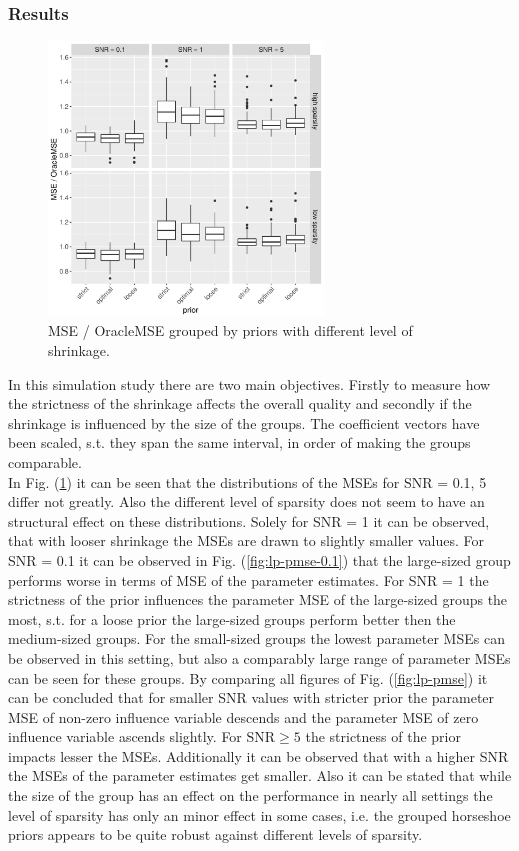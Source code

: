 \documentclass[12pt,letterpaper]{article}
\numberwithin{equation}{subsection}
\begin{document}
\subsubsection{Results}
\label{sec:lpres}
\begin{figure}[hbt!]
 \centering
 \includegraphics[width=0.65\textwidth]{../plots/lp-mse.pdf}
 \caption[MSE / OracleMSE (linear predictor scenario)]{MSE / OracleMSE grouped by priors with different level of shrinkage.}
 \label{fig:lp-mse}
\end{figure}
In this simulation study there are two main objectives. Firstly to measure how the strictness of the shrinkage affects the overall quality and secondly if the shrinkage is influenced by the size of the groups. The coefficient vectors have been scaled, s.t. they span the same interval, in order of making the groups comparable. \\
In Fig. (\ref{fig:lp-mse}) it can be seen that the distributions of the MSEs for SNR = 0.1, 5 differ not greatly. Also the different level of sparsity does not seem to have an structural effect on these distributions. Solely for SNR = 1 it can be observed, that with looser shrinkage the MSEs are drawn to slightly smaller values. For SNR = 0.1 it can be observed in Fig. (\ref{fig:lp-pmse-0.1}) that the large-sized group performs worse in terms of MSE of the parameter estimates. For SNR = 1 the strictness of the prior influences the parameter MSE of the large-sized groups the most, s.t. for a loose prior the large-sized groups perform better then the medium-sized groups. For the small-sized groups the lowest parameter MSEs can be observed in this setting, but also a comparably large range of parameter MSEs can be seen for these groups. By comparing all figures of Fig. (\ref{fig:lp-pmse}) it can be concluded that for smaller SNR values with stricter prior the parameter MSE of non-zero influence variable descends and the parameter MSE of zero influence variable ascends slightly. For $\text{SNR} \geq 5$ the strictness of the prior impacts lesser the MSEs. Additionally it can be observed that with a higher SNR the MSEs of the parameter estimates get smaller. Also it can be stated that while the size of the group has an effect on the performance in nearly all settings the level of sparsity has only an minor effect in some cases, i.e. the grouped horseshoe priors appears to be quite robust against different levels of sparsity.
\end{document}
